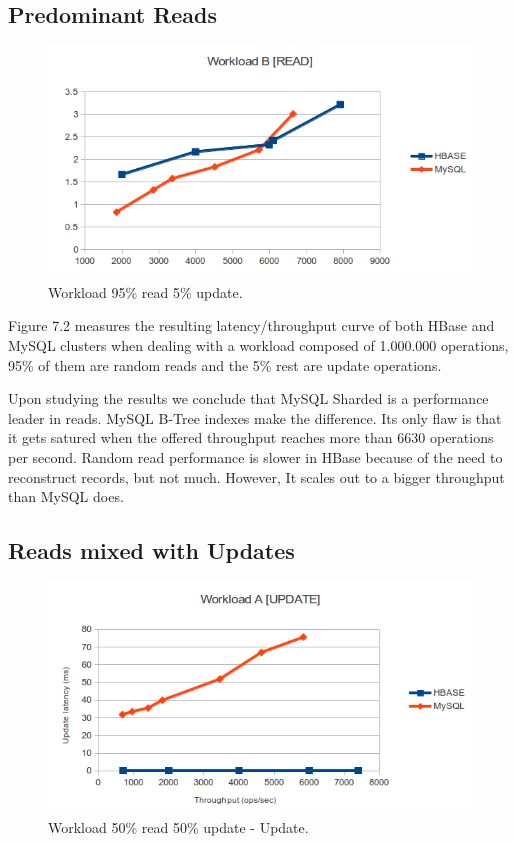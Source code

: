 \subsection{Predominant Reads}

\begin{figure}[htb]
\centering
\includegraphics[width=1\textwidth]{./images/workloadBRead.png}
\caption{Workload 95\% read 5\% update.}
 \label{fig:BRead}
\end{figure}

Figure 7.2 measures the resulting latency/throughput curve of both HBase and MySQL clusters when dealing with a workload composed of 1.000.000 operations, 95\% of them are random reads and the 5\% rest are update operations.
\par
Upon studying the results we conclude that MySQL Sharded is a performance leader in reads. MySQL B-Tree indexes make the difference. Its only flaw is that it gets satured when the offered throughput reaches more than 6630 operations per second. Random read performance is slower in HBase because of the need to reconstruct records, but not much. However, It scales out to a bigger throughput than MySQL does.


\subsection{Reads mixed with Updates}


\begin{figure}[htb]
\centering
\includegraphics[width=1\textwidth]{./images/workloadAUpdate.png}
\caption{Workload 50\% read 50\% update - Update.}
\label{fig:AUpdate}
\end{figure}

